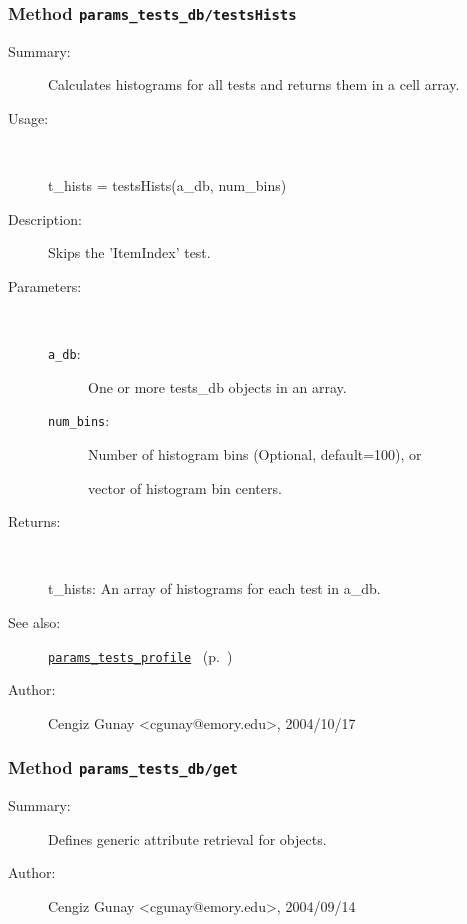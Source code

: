 \subsubsection[Method \texttt{testsHists}]{Method \texttt{params\_tests\_db/testsHists}}%
%
\label{ref_params_tests_db__testsHists}%
\hypertarget{ref_params_tests_db__testsHists}{}%
\begin{description}
\item[Summary:]Calculates histograms for all tests and returns them in a cell array.
%
\item[Usage:]~%
\begin{lyxcode}%
t\_hists = testsHists(a\_db, num\_bins)
%
\end{lyxcode}%
%
\item[Description:]%
Skips the 'ItemIndex' test.
\item[Parameters:]~
\begin{description}%
\item[\texttt{a\_db}:]
 One or more tests\_db objects in an array.
\item[\texttt{num\_bins}:]
 Number of histogram bins (Optional, default=100), or

vector of histogram bin centers.\end{description}%
%
\item[Returns:]~

	t\_hists: An array of histograms for each test in a\_db.
%
%
\item[See also:]%
\hyperlink{ref_params_tests_profile}{\texttt{params\_tests\_profile}}%
\ (p.~\pageref{ref_params_tests_profile})%
%
%
\item[Author:]%
Cengiz Gunay <cgunay@emory.edu>, 2004/10/17%
\end{description}
\methodline%
\subsubsection[Method \texttt{get}]{Method \texttt{params\_tests\_db/get}}%
%
\label{ref_params_tests_db__get}%
\hypertarget{ref_params_tests_db__get}{}%
\begin{description}
\item[Summary:]Defines generic attribute retrieval for objects.
%
%
%
%
%
%
%
\item[Author:]%
Cengiz Gunay <cgunay@emory.edu>, 2004/09/14%
\end{description}
\methodline%
